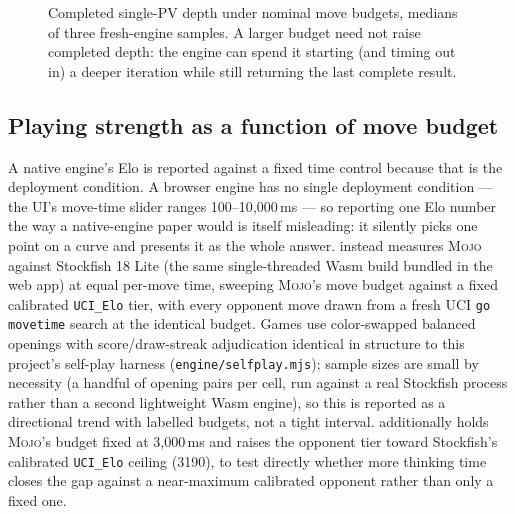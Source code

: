 \documentclass[10pt,twocolumn]{article}
\newcommand{\engine}{\textsc{Mojo}}
\newcommand{\code}[1]{\texttt{#1}}
\begin{document}
\begin{figure}[t]
\centering
{}
\caption{Completed single-PV depth under nominal move budgets, medians of
three fresh-engine samples. A larger budget need not raise completed depth:
the engine can spend it starting (and timing out in) a deeper iteration
while still returning the last complete result.}
\label{fig:timed-depth}
\end{figure}

\subsection{Playing strength as a function of move budget}
\label{sec:strength-budget}

A native engine's Elo is reported against a fixed time control because that
is the deployment condition. A browser engine has no single deployment
condition --- the UI's move-time slider ranges 100--10{,}000\,ms --- so
reporting one Elo number the way a native-engine paper would is itself
misleading: it silently picks one point on a curve and presents it as the
whole answer.  instead measures \engine{} against
Stockfish 18 Lite \citep{stockfish2026,stockfishjs2026} (the same
single-threaded Wasm build bundled in the web app) at equal per-move time, sweeping \engine's move budget against a fixed
calibrated \code{UCI\_Elo} tier, with every opponent move drawn from a fresh
UCI \code{go movetime} search at the identical budget. Games use
color-swapped balanced openings with score/draw-streak adjudication
identical in structure to this project's self-play harness
(\code{engine/selfplay.mjs}); sample sizes are small by necessity (a handful
of opening pairs per cell, run against a real Stockfish process rather than
a second lightweight Wasm engine), so this is reported as a directional
trend with labelled budgets, not a tight interval.
 additionally holds \engine's budget fixed at 3{,}000\,ms
and raises the opponent tier toward Stockfish's calibrated \code{UCI\_Elo}
ceiling (3190), to test directly whether more thinking time closes the gap
against a near-maximum calibrated opponent rather than only a fixed one.
\end{document}
